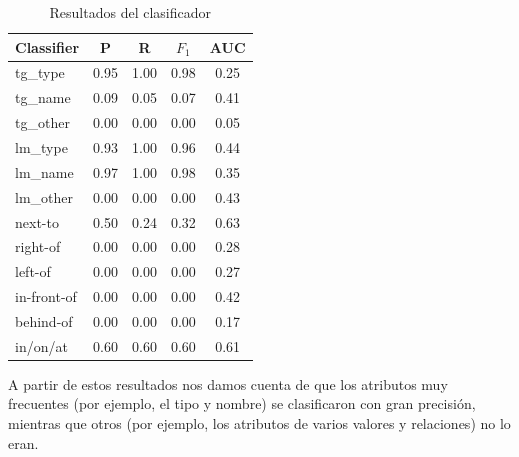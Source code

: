 \begin{table}[ht]
\begin{center}
\footnotesize{
\caption{Resultados del clasificador}
\begin{tabular}{l c c c c }
\hline
{{Classifier}}	& {P} & {R} & {$F_{1}$} & {AUC} \\
\hline
{{tg\_type}} 			& 0.95 & 1.00 & 0.98 & 0.25 \\
{{tg\_name}}			& 0.09 & 0.05 & 0.07 & 0.41 \\
{{tg\_other}}			& 0.00 & 0.00 & 0.00 & 0.05 \\                               
{{lm\_type}}			& 0.93 & 1.00 & 0.96 & 0.44 \\                               
{{lm\_name}}			& 0.97 & 1.00 & 0.98 & 0.35 \\                               
{{lm\_other}}			& 0.00 & 0.00 & 0.00 & 0.43 \\                               
{{next-to}}				& 0.50 & 0.24 & 0.32 & 0.63 \\                               
{{right-of}}			& 0.00 & 0.00 & 0.00 & 0.28 \\                               
{{left-of}}				& 0.00 & 0.00 & 0.00 & 0.27 \\                               
{{in-front-of}}		& 0.00 & 0.00 & 0.00 & 0.42 \\                               
{{behind-of}}			& 0.00 & 0.00 & 0.00 & 0.17 \\                               
{{in/on/at}} 			& 0.60 & 0.60 & 0.60 & 0.61 \\                               
\hline                   
\end{tabular}
\label{tab-svm-results}
}
\end{center}
\end{table}
\normalsize


A partir de estos resultados nos damos cuenta de que los atributos muy frecuentes (por ejemplo, el tipo y nombre) se clasificaron con gran precisi\'on, mientras que otros (por ejemplo, los atributos de varios valores y relaciones) no lo eran.







